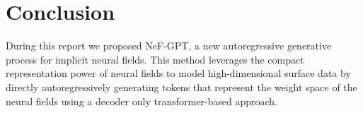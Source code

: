 \section{Conclusion}

During this report we proposed NeF-GPT, a new autoregressive generative process for implicit neural fields. This method leverages the compact representation power of neural fields to model high-dimensional surface data by directly autoregressively generating tokens that represent the weight space of the neural fields using a decoder only transformer-based approach.